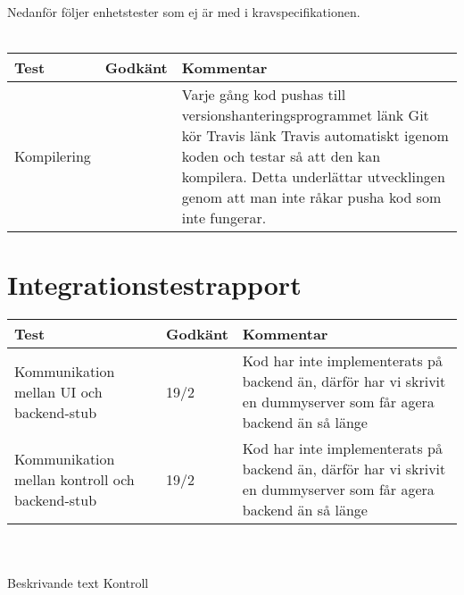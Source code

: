\documentclass[10pt]{article}
\begin{document}
  Nedanför följer enhetstester som ej är med i kravspecifikationen.
\\ \\
\noindent
\begin{tabular}{ | p{5cm} | p{1.2cm}| p{7cm}|}
  	\hline
	Test&Godkänt&Kommentar\\
   	\hline
	
	Kompilering&&Varje gång kod pushas till versionshanteringsprogrammet {\color {red} länk Git} kör Travis {\color {red} länk Travis} automatiskt igenom koden och testar så att den kan kompilera. Detta underlättar utvecklingen genom att man inte råkar pusha kod som inte fungerar.\\
   	\hline
   
  \end{tabular}
  

\section{Integrationstestrapport}
\begin{tabular}{ | p{5cm} | p{1.2cm}| p{7cm}|}
  	\hline
	Test&Godkänt&Kommentar\\
   	\hline
  	 Kommunikation mellan UI och backend-stub&19/2&Kod har inte implementerats på backend än, därför har vi skrivit en dummyserver som får agera backend än så länge\\
  	\hline
   	Kommunikation mellan kontroll och backend-stub&19/2&Kod har inte implementerats på backend än, därför har vi skrivit en dummyserver som får agera backend än så länge\\
   	\hline
   
  \end{tabular}
  \\
  \\
  Beskrivande text Kontroll
  \\
  \noindent
  \\
  \\
  \\
\end{document}
